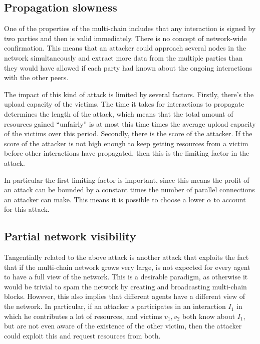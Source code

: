 \documentclass[a4paper,11pt]{book}
\theoremstyle{definition}
\begin{document}
\subsection{Propagation slowness}

One of the properties of the multi-chain includes that any interaction is signed by two parties and
then is valid immediately. There is no concept of network-wide confirmation. This means that an attacker
could approach several nodes in the network simultaneously and extract more data from the multiple parties
than they would have allowed if each party had known about the ongoing interactions with the other peers.

The impact of this kind of attack is limited by several factors. Firstly, there's the upload capacity of the
victims. The time it takes for interactions to propagate determines the length of the attack, which means that
the total amount of resources gained ``unfairly'' is at most this time times the average upload capacity of
the victims over this period. Secondly, there is the score of the attacker. If the score of the attacker is
not high enough to keep getting resources from a victim before other interactions have propagated, then this
is the limiting factor in the attack. 

In particular the first limiting factor is important, since this means the profit of an attack can be bounded
by a constant times the number of parallel connections an attacker can make. This means it is possible
to choose a lower $\alpha$ to account for this attack. 

\subsection{Partial network visibility}

Tangentially related to the above attack is another attack that exploits the fact that if the multi-chain
network grows very large, is not expected for every agent to have a full view of the network. This
is a desirable paradigm, as otherwise it would be trivial to spam the network by creating and broadcasting
multi-chain blocks. However, this also implies that different agents have a different view of the network.
In particular, if an attacker $s$ participates in an interaction $I_1$ in which he contributes a lot
of resources, and victims $v_1, v_2$ both know about $I_1$, but are not even aware of the existence of
the other victim, then the attacker could exploit this and request resources from both. 
\end{document}
